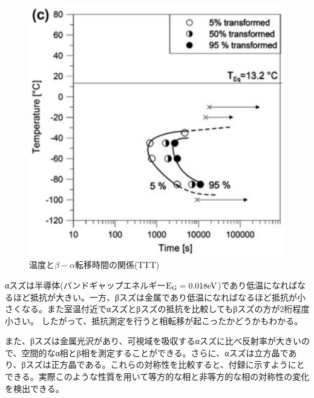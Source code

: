 \begin{figure}[htb]
    \begin{center}
   \includegraphics[width=130mm]{Introduction/TTT.eps}
  \end{center}
  \caption{温度と$\beta-\alpha$転移時間の関係(TTT)\cite{Nogita}}
  \label{fig:TTT}
\end{figure}

αスズは半導体(バンドギャップエネルギー$\rm E_G=0.018eV$)であり低温になればなるほど抵抗が大きい。一方、βスズは金属であり低温になればなるほど抵抗が小さくなる。また室温付近でαスズとβスズの抵抗を比較してもβスズの方が2桁程度小さい。\cite{} したがって、抵抗測定を行うと相転移が起こったかどうかもわかる。

また、βスズは金属光沢があり、可視域を吸収するαスズに比べ反射率が大きいので、空間的なα相とβ相を測定することができる。さらに、αスズは立方晶であり、βスズは正方晶である。これらの対称性を比較すると、付録に示すようにとできる。実際このような性質を用いて等方的な相と非等方的な相の対称性の変化を検出できる\cite{Matvienko}。


